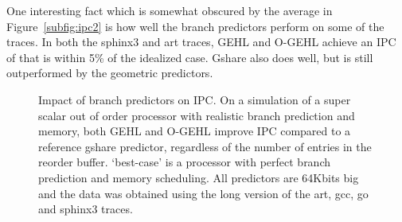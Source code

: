 One interesting fact which is somewhat obscured by the average in
Figure~\ref{subfig:ipc2} is how well the branch predictors perform on some of
the traces.  In both the sphinx3 and art traces, GEHL and O-GEHL achieve an IPC
of that is within 5\% of the idealized case.  Gshare also does well, but is
still outperformed by the geometric predictors.
\begin{figure}[h]

  \caption{Impact of branch predictors on IPC.  On a simulation of a super scalar out of order processor with realistic branch prediction and memory, both GEHL and O-GEHL improve IPC compared to a reference gshare predictor, regardless of the number of entries in the reorder buffer.  `best-case' is a processor with perfect branch prediction and memory scheduling.  All predictors are 64Kbits big and the data was obtained using the long version of the art, gcc, go and sphinx3 traces.}
 \label{fig:ipc}
\end{figure}
